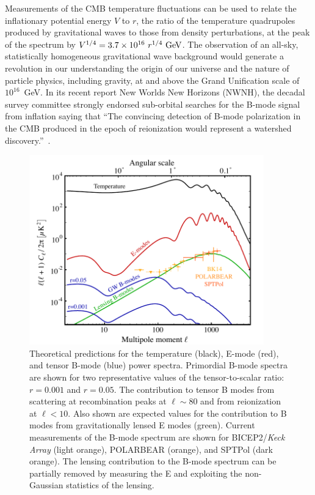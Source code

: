 Measurements of the CMB temperature fluctuations can be used to relate the inflationary potential energy $V$ to $r$, the ratio of the temperature quadrupoles produced by gravitational waves to those from density perturbations, at the peak of the spectrum by $V^{1/4} = 3.7 \times 10^{16} \ r^{1/4}\,\, {\rm GeV}$. The observation of an all-sky, statistically homogeneous gravitational wave background would generate a revolution in our understanding the origin of our universe and the nature of particle physics, including gravity, at and above the Grand Unification scale of $10^{16}$~GeV.  In its recent report New Worlds New Horizons (NWNH), the decadal survey committee strongly endorsed sub-orbital searches for the B-mode signal from inflation saying that ``The convincing detection of B-mode polarization in the CMB produced in the epoch of reionization would represent a watershed discovery.''~\cite{blandford2010}.

\begin{figure}[h]
\begin{center}
\includegraphics[width=4in]{figs/cmb_powspec_v4.pdf}
\end{center}
\caption{Theoretical predictions for the temperature (black), 
E-mode (red), and tensor B-mode (blue) power spectra. Primordial 
B-mode spectra are shown for two representative values of the tensor-to-scalar
ratio: $r=0.001$ and $r=0.05.$ 
The contribution to tensor B modes from scattering at recombination peaks at $\ell \sim 80$
and from reionization at $\ell < 10$.
Also shown are expected values for the contribution to B modes from gravitationally lensed E modes (green).
Current measurements of the B-mode spectrum are shown for {BICEP}2/{\em Keck Array} (light orange), POLARBEAR (orange), and SPTPol (dark orange). 
The lensing contribution to the B-mode spectrum can be partially removed by measuring the 
E and exploiting the non-Gaussian statistics of the lensing.
}
\label{fig:clall}
\end{figure}

